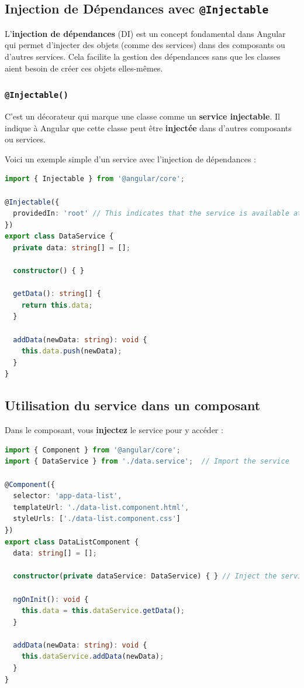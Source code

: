 \documentclass{article}
\begin{document}
\subsection{Injection de Dépendances avec \texttt{@Injectable}}

L'\textbf{injection de dépendances} (DI) est un concept fondamental dans Angular qui permet d’injecter des objets (comme des services) dans des composants ou d'autres services. Cela facilite la gestion des dépendances sans que les classes aient besoin de créer ces objets elles-mêmes.

\subsubsection{\texttt{@Injectable()}}

C’est un décorateur qui marque une classe comme un \textbf{service injectable}. Il indique à Angular que cette classe peut être \textbf{injectée} dans d’autres composants ou services.

Voici un exemple simple d'un service avec l'injection de dépendances :

\begin{lstlisting}[language=TypeScript, caption={TypeScript service example}, label={lst:typescript-service}]
import { Injectable } from '@angular/core';

@Injectable({
  providedIn: 'root' // This indicates that the service is available at the application level
})
export class DataService {
  private data: string[] = [];

  constructor() { }

  getData(): string[] {
    return this.data;
  }

  addData(newData: string): void {
    this.data.push(newData);
  }
}
\end{lstlisting}

\subsection{Utilisation du service dans un composant}

Dans le composant, vous \textbf{injectez} le service pour y accéder :

\begin{lstlisting}[language=TypeScript, caption={Using a service in a component}, label={lst:typescript-service-usage}]
import { Component } from '@angular/core';
import { DataService } from './data.service';  // Import the service

@Component({
  selector: 'app-data-list',
  templateUrl: './data-list.component.html',
  styleUrls: ['./data-list.component.css']
})
export class DataListComponent {
  data: string[] = [];

  constructor(private dataService: DataService) { } // Inject the service

  ngOnInit(): void {
    this.data = this.dataService.getData();
  }

  addData(newData: string): void {
    this.dataService.addData(newData);
  }
}
\end{lstlisting}
\end{document}
